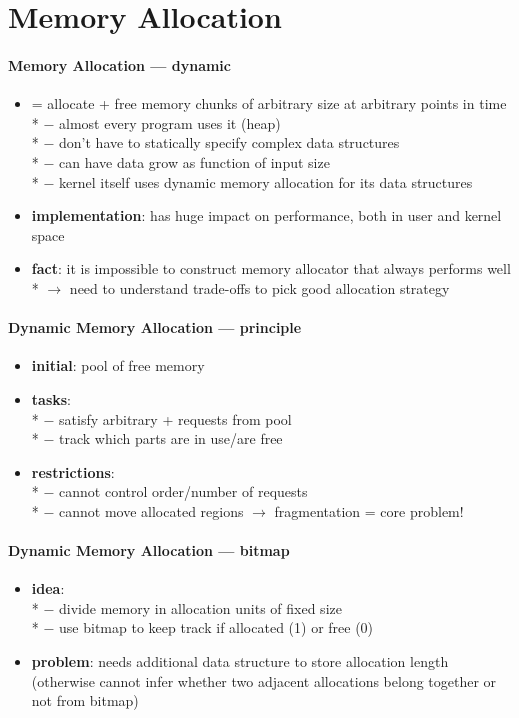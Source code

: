 \section{Memory Allocation}

\paragraph{Memory Allocation --- dynamic}
\begin{itemize}
  \item = allocate + free memory chunks of arbitrary size at arbitrary points in time \\*
    $ - $ almost every program uses it (heap) \\*
    $ - $ don't have to statically specify complex data structures \\*
    $ - $ can have data grow as function of input size \\*
    $ - $ kernel itself uses dynamic memory allocation for its data structures
  \item \textbf{implementation}: has huge impact on performance, both in user and kernel space
  \item \textbf{fact}: it is impossible to construct memory allocator that always performs well \\*
    $ \to $ need to understand trade-offs to pick good allocation strategy
\end{itemize}

\paragraph{Dynamic Memory Allocation --- principle}
\begin{itemize}
  \item \textbf{initial}: pool of free memory
  \item \textbf{tasks}: \\*
    $ - $ satisfy arbitrary  +  requests from pool \\*
    $ - $ track which parts are in use/are free
  \item \textbf{restrictions}: \\*
    $ - $ cannot control order/number of requests \\*
    $ - $ cannot move allocated regions $ \to $ fragmentation = core problem!
\end{itemize}

\paragraph{Dynamic Memory Allocation --- bitmap}
\begin{itemize}
  \item \textbf{idea}: \\*
    $ - $ divide memory in allocation units of fixed size \\*
    $ - $ use bitmap to keep track if allocated (1) or free (0)
  \item \textbf{problem}: needs additional data structure to store allocation length (otherwise cannot infer whether two adjacent allocations belong together or not from bitmap)
\end{itemize}

